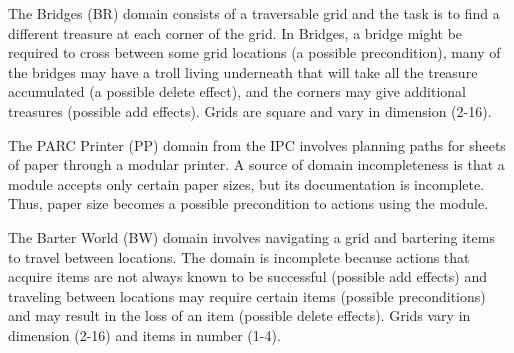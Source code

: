 \documentclass{article}
\begin{document}
The Bridges (BR) domain consists of a traversable grid and the task is to find a
different treasure at each corner of the grid. In Bridges,
a bridge might be required  to cross between some grid locations (a possible
precondition), many of the bridges may have a troll living
underneath that will take all the treasure accumulated (a possible delete
effect), and the corners may give additional treasures (possible add
effects).  Grids are square and vary in dimension (2-16).

The PARC Printer (PP) domain from the IPC involves planning paths for sheets of
paper through a modular printer.  A source of domain incompleteness is that a module
accepts only certain paper sizes, but its documentation is incomplete.  Thus,
paper size becomes a possible precondition to actions using the module.

The Barter World (BW) domain involves navigating a grid and bartering items to
travel between locations.  The domain is incomplete because actions that acquire
 items are not always known to be successful (possible add effects) and traveling between locations may require
certain items (possible preconditions) and may result in the loss of an item
(possible delete effects). Grids vary in dimension (2-16) and items
in number (1-4).
\end{document}
